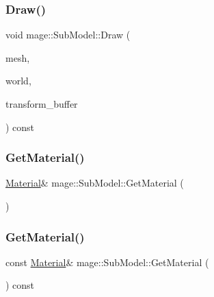 \subsubsection{\texorpdfstring{Draw()}{Draw()}\hspace{0.1cm}{\footnotesize\ttfamily [2/2]}}
{\footnotesize\ttfamily void mage\+::\+Sub\+Model\+::\+Draw (\begin{DoxyParamCaption}\item[{const \hyperlink{classmage_1_1_mesh}{Mesh} \&}]{mesh,  }\item[{const \hyperlink{classmage_1_1_world}{World} \&}]{world,  }\item[{const Transform\+Buffer \&}]{transform\+\_\+buffer }\end{DoxyParamCaption}) const}

\hypertarget{classmage_1_1_sub_model_a8487b28be21ae182cd97c61325b2b478}{}\label{classmage_1_1_sub_model_a8487b28be21ae182cd97c61325b2b478} 
\subsubsection{\texorpdfstring{Get\+Material()}{GetMaterial()}\hspace{0.1cm}{\footnotesize\ttfamily [1/2]}}
{\footnotesize\ttfamily \hyperlink{structmage_1_1_material}{Material}\& mage\+::\+Sub\+Model\+::\+Get\+Material (\begin{DoxyParamCaption}{ }\end{DoxyParamCaption})}

\hypertarget{classmage_1_1_sub_model_ab9e1c661e94a2ac0d819ad5d36a18a4c}{}\label{classmage_1_1_sub_model_ab9e1c661e94a2ac0d819ad5d36a18a4c} 
\subsubsection{\texorpdfstring{Get\+Material()}{GetMaterial()}\hspace{0.1cm}{\footnotesize\ttfamily [2/2]}}
{\footnotesize\ttfamily const \hyperlink{structmage_1_1_material}{Material}\& mage\+::\+Sub\+Model\+::\+Get\+Material (\begin{DoxyParamCaption}{ }\end{DoxyParamCaption}) const}

